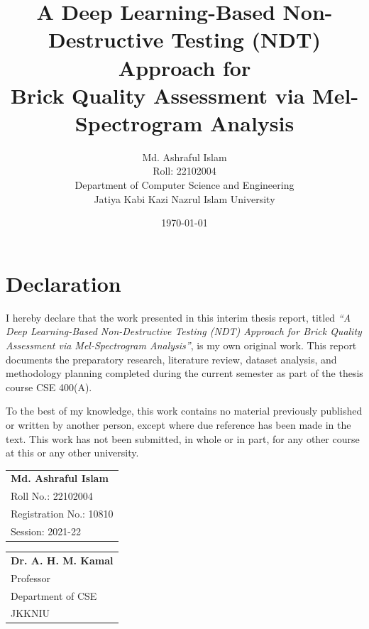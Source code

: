 \documentclass[12pt,a4paper,oneside]{report}
\title{
    \vspace*{2cm}
    \textbf{A Deep Learning-Based Non-Destructive Testing (NDT) Approach for\\[4pt]
    Brick Quality Assessment via Mel-Spectrogram Analysis}
}
\author{
    Md. Ashraful Islam\\[6pt]
    \small Roll: 22102004\\[6pt]
    \small Department of Computer Science and Engineering\\[6pt]
    \small Jatiya Kabi Kazi Nazrul Islam University
}
\date{\today}
\begin{document}
\maketitle
\thispagestyle{empty}
\newpage

\chapter*{Declaration}

I hereby declare that the work presented in this interim thesis report, titled
\textit{``A Deep Learning-Based Non-Destructive Testing (NDT) Approach for
Brick Quality Assessment via Mel-Spectrogram Analysis''}, is my own original
work. This report documents the preparatory research, literature review,
dataset analysis, and methodology planning completed during the current
semester as part of the thesis course CSE 400(A).

To the best of my knowledge, this work contains no material previously
published or written by another person, except where due reference has been
made in the text. This work has not been submitted, in whole or in part, for
any other course at this or any other university.

\vspace{3.5cm}
\noindent
\begin{minipage}[b]{0.45\textwidth}
\vspace{0pt}
\begin{tabular}{@{}l@{}}
\textbf{Md. Ashraful Islam} \\
Roll No.: 22102004 \\
Registration No.: 10810 \\
Session: 2021-22 \\
\end{tabular}
\end{minipage}
\hfill
\begin{minipage}[b]{0.45\textwidth}
\vspace{0pt}
\begin{tabular}{@{}l@{}}
\textbf{Dr. A. H. M. Kamal} \\
Professor \\
Department of CSE \\
JKKNIU \\
\end{tabular}
\end{minipage}

\newpage

\end{document}
